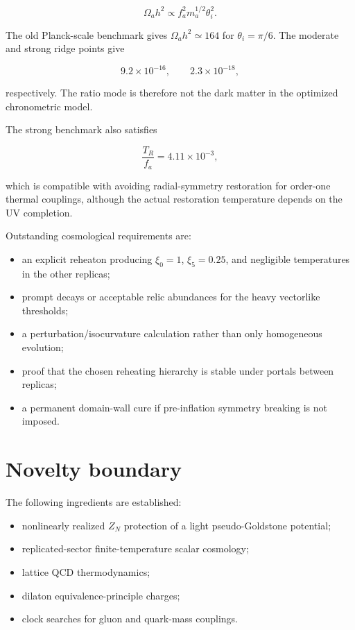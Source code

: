 \documentclass[
  10pt,
]{article}
\providecommand{\tightlist}{%
  \setlength{\itemsep}{0pt}\setlength{\parskip}{0pt}}
\begin{document}
\[
\Omega_a h^2\propto f_a^2m_a^{1/2}\theta_i^2.
\]

The old Planck-scale benchmark gives \(\Omega_a h^2\simeq164\) for
\(\theta_i=\pi/6\). The moderate and strong ridge points give

\[
9.2\times10^{-16},
\qquad
2.3\times10^{-18},
\]

respectively. The ratio mode is therefore not the dark matter in the
optimized chronometric model.

The strong benchmark also satisfies

\[
\frac{T_R}{f_a}=4.11\times10^{-3},
\]

which is compatible with avoiding radial-symmetry restoration for
order-one thermal couplings, although the actual restoration temperature
depends on the UV completion.

Outstanding cosmological requirements are:

\begin{itemize}
\tightlist
\item
  an explicit reheaton producing \(\xi_0=1\), \(\xi_5=0.25\), and
  negligible temperatures in the other replicas;
\item
  prompt decays or acceptable relic abundances for the heavy vectorlike
  thresholds;
\item
  a perturbation/isocurvature calculation rather than only homogeneous
  evolution;
\item
  proof that the chosen reheating hierarchy is stable under portals
  between replicas;
\item
  a permanent domain-wall cure if pre-inflation symmetry breaking is not
  imposed.
\end{itemize}

\section{Novelty boundary}\label{novelty-boundary}

The following ingredients are established:

\begin{itemize}
\tightlist
\item
  nonlinearly realized \(Z_N\) protection of a light pseudo-Goldstone
  potential;
\item
  replicated-sector finite-temperature scalar cosmology;
\item
  lattice QCD thermodynamics;
\item
  dilaton equivalence-principle charges;
\item
  clock searches for gluon and quark-mass couplings.
\end{itemize}
\end{document}
